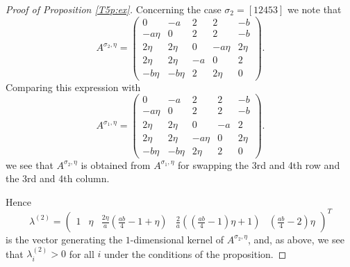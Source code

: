 \documentclass[titlepage]{amsart}
\numberwithin{equation}{section}
\theoremstyle{plain}
\theoremstyle{definition}
\theoremstyle{remark}
\begin{document}
\begin{proof}[Proof of Proposition \ref{T5p:ex}]
\smallskip


Concerning the case $\sigma_2=[1 2 4 5 3]$ we note that
$$A^{\sigma_2,\eta}=\begin{pmatrix}
	0&-a&2&2&-b\\ -a\eta &0&2&2&-b \\ 2\eta &2\eta &0&-a \eta &2 \eta \\ 2\eta &2\eta &-a &0&2\\-b\eta &-b\eta &2 &2 \eta &0
\end{pmatrix}.
$$
Comparing this  expression with 
$$ A^{\sigma_1,\eta}=\begin{pmatrix}
	0&-a&2&2&-b\\ -a\eta &0&2&2&-b \\ 2\eta &2\eta &0&-a&2\\ 2\eta &2\eta &-a\eta &0&2\eta\\-b\eta &-b\eta &2\eta &2 &0
\end{pmatrix}.	
$$
we see that $A^{\sigma_2, \eta}$ is obtained from $A^{\sigma_1, \eta}$ for swapping 
the 3rd and 4th row and the 3rd and 4th column.



  Hence
$$
\lambda^{(2)}=\begin{pmatrix}1&\eta &\tfrac{2\eta}{a}\left(\tfrac{ab}{4}-1+\eta\right)&\tfrac{2}{a}\left((\tfrac{ab}{4}-1)\eta+1\right)&\left(\frac{ab}{4}-2\right)\eta\end{pmatrix}^T
$$
is the vector generating the $1$-dimensional kernel of $A^{\sigma_2,\eta}$, and, as above, we see that $\lambda^{(2)}_i>0$ for all $i$ under the conditions of the proposition.  

\smallskip


\end{proof}
\end{document}
